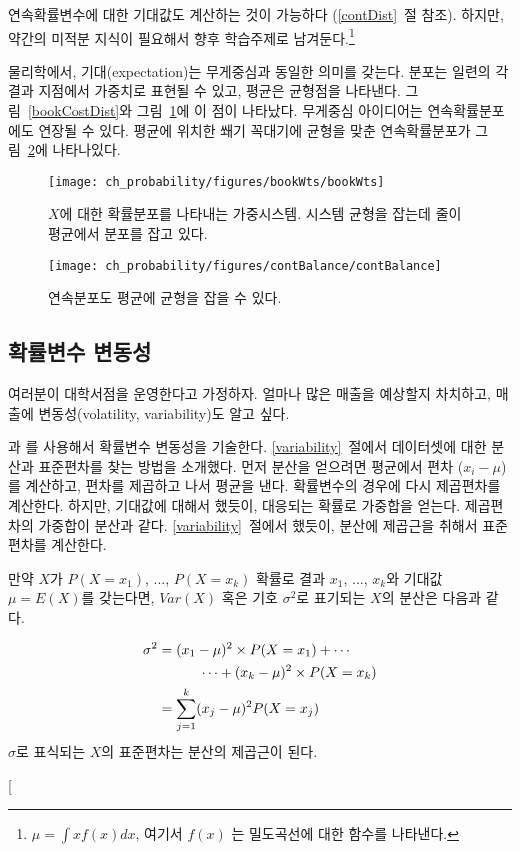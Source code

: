 연속확률변수에 대한 기대값도 계산하는 것이 가능하다 (\ref{contDist}~절 참조). 하지만, 약간의 미적분 지식이 필요해서 향후 학습주제로 남겨둔다.\footnote{$\mu = \int xf(x)dx$, 여기서 $f(x)$ 는 밀도곡선에 대한 함수를 나타낸다.}

물리학에서, 기대(expectation)는 무게중심과 동일한 의미를 갖는다. 분포는 일련의 각 결과 지점에서 가중치로 표현될 수 있고, 평균은 균형점을 나타낸다. 그림~\ref{bookCostDist}와 그림~\ref{bookWts}에 이 점이 나타났다. 무게중심 아이디어는 연속확률분포에도 연장될 수 있다. 평균에 위치한 쐐기 꼭대기에 균형을 맞춘 연속확률분포가 그림~\ref{contBalance}에 나타나있다.

\begin{figure}
\centering
\texttt{[image: ch\_probability/figures/bookWts/bookWts]}
\caption{$X$에 대한 확률분포를 나타내는 가중시스템. 시스템 균형을 잡는데 줄이 평균에서 분포를 잡고 있다.}
\label{bookWts}
\end{figure}

\begin{figure}
\centering
\texttt{[image: ch\_probability/figures/contBalance/contBalance]}
\caption{연속분포도 평균에 균형을 잡을 수 있다.}
\label{contBalance}
\end{figure}



\subsection{확률변수 변동성}

여러분이 대학서점을 운영한다고 가정하자. 얼마나 많은 매출을 예상할지 차치하고, 매출에 변동성(volatility, variability)도 알고 싶다.

과 를 사용해서 확률변수 변동성을 기술한다. \ref{variability}~절에서 데이터셋에 대한 분산과 표준편차를 찾는 방법을 소개했다. 먼저 분산을 얻으려면 평균에서 편차 ($x_i - \mu$)를 계산하고, 편차를 제곱하고 나서 평균을 낸다. 확률변수의 경우에 다시 제곱편차를 계산한다. 하지만, 기대값에 대해서 했듯이, 대응되는 확률로 가중합을 얻는다. 제곱편차의 가중합이 분산과 같다. \ref{variability}~절에서 했듯이, 분산에 제곱근을 취해서 표준편차를 계산한다. 


\begin{termBox}{
만약 $X$가 $P(X=x_1)$, ..., $P(X=x_k)$ 확률로 결과 $x_1$, ..., $x_k$와 기대값 $\mu=E(X)$를 갖는다면, 
$Var(X)$ 혹은 기호 $\sigma^2$로 표기되는 $X$의 분산은 다음과 같다.

\begin{align}
\sigma^2 &= (x_1-\mu)^2\times P(X=x_1) + \cdots \notag \\
	& \qquad\quad\cdots+ (x_k-\mu)^2\times P(X=x_k) \notag \\
	&= \sum_{j=1}^{k} (x_j - \mu)^2 P(X=x_j)
\end{align}
$\sigma$로 표식되는 $X$의 표준편차는 분산의 제곱근이 된다.}
\end{termBox}
\marginpar[\raggedright\vspace{-47mm}

